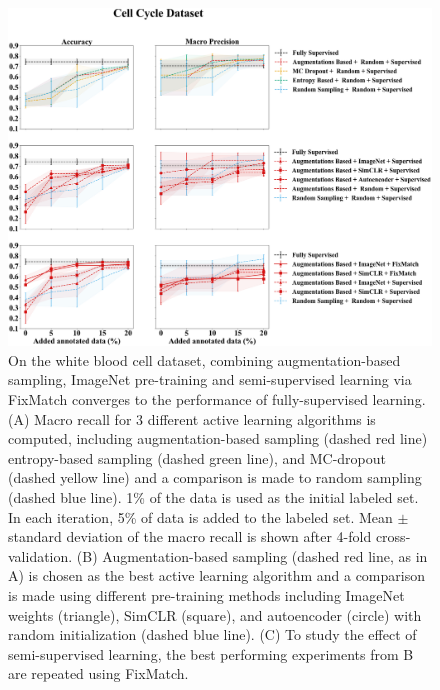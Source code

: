 \begin{figure}[htbp]
\centering
\captionsetup{format=plain}
\includegraphics[width=\textwidth]{figures/fig_2_cycle_acc_precision.png}
\caption{On the white blood cell dataset, combining augmentation-based sampling, ImageNet pre-training and semi-supervised learning via FixMatch converges to the performance of fully-supervised learning. (A) Macro recall for 3 different active learning algorithms is computed, including augmentation-based sampling (dashed red line) entropy-based sampling (dashed green line), and MC-dropout (dashed yellow line) and a comparison is made to random sampling (dashed blue line). 1\% of the data is used as the initial labeled set. In each iteration, 5\% of data is added to the labeled set. Mean $\pm$ standard deviation of the macro recall is shown after 4-fold cross-validation. (B) Augmentation-based sampling (dashed red line, as in A) is chosen as the best active learning algorithm and a comparison is made using different pre-training methods including ImageNet weights (triangle), SimCLR (square), and autoencoder (circle) with random initialization (dashed blue line). (C) To study the effect of semi-supervised learning, the best performing experiments from B are repeated using FixMatch.}
\label{fig:fig_2_cycle_acc_precision}
\end{figure}

